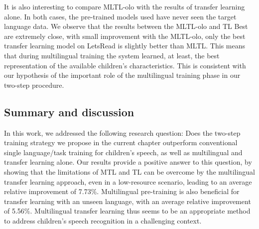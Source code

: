 It is also interesting to compare MLTL-olo with the results of transfer learning alone. In both cases, the pre-trained models used have never seen the target language data. We observe that the results between the MLTL-olo and TL Best are extremely close, with small improvement with the MLTL-olo, only the best transfer learning model on LetsRead is slightly better than MLTL. This means that during multilingual training the system learned, at least, the best representation of the available children's characteristics. This is consistent with our hypothesis of the important role of the multilingual training phase in our two-step procedure.

\subsection{Summary and discussion}
In this work, we addressed the following research question: Does the two-step training strategy we propose in the current chapter outperform conventional single language/task training for children's speech, as well as multilingual and transfer learning alone. Our results provide a positive answer to this question, by showing that the limitations of MTL and TL can be overcome by the multilingual transfer learning approach, even in a low-resource scenario, leading to an average relative improvement of 7.73\%. Multilingual pre-training is also beneficial for transfer learning with an unseen language, with an average relative improvement of 5.56\%. Multilingual transfer learning thus seems to be an appropriate method to address children's speech recognition in a challenging context.


